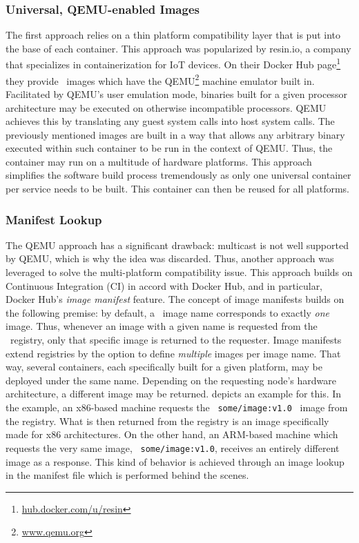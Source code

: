 \subsubsection{Universal, QEMU-enabled Images}
The first approach relies on a thin platform compatibility layer that is put into the base of each container. This approach was popularized by resin.io, a company that specializes in containerization for IoT devices. On their Docker Hub page\footnote{\url{hub.docker.com/u/resin}} they provide \docker\ images which have the QEMU\footnote{\url{www.qemu.org}} machine emulator built in. Facilitated by QEMU's user emulation mode, binaries built for a given processor architecture may be executed on otherwise incompatible processors. QEMU achieves this by translating any guest system calls into host system calls. The previously mentioned images are built in a way that allows any arbitrary binary executed within such container to be run in the context of QEMU. Thus, the container may run on a multitude of hardware platforms.
This approach simplifies the software build process tremendously as only one universal container per service needs to be built. This container can then be reused for all platforms.

\pagebreak
\subsubsection{Manifest Lookup}

The QEMU approach has a significant drawback: multicast is not well supported by QEMU, which is why the idea was discarded.
Thus, another approach was leveraged to solve the multi-platform compatibility issue. This approach builds on Continuous Integration (CI) in accord with Docker Hub, and in particular, Docker Hub's \emph{image manifest} feature. The concept of image manifests builds on the following premise: by default, a \docker\ image name corresponds to exactly \emph{one} image. Thus, whenever an image with a given name is requested from the \docker\ registry, only that specific image is returned to the requester. Image manifests extend registries by the option to define \emph{multiple} images per image name. That way, several containers, each specifically built for a given platform, may be deployed under the same name. Depending on the requesting node's hardware architecture, a different image may be returned.  depicts an example for this. In the example, an x86-based machine requests the \ \mbox{\texttt{some/image:v1.0}} \ image from the registry. What is then returned from the registry is an image specifically made for x86 architectures. On the other hand, an ARM-based machine which requests the very same image, \ \mbox{\texttt{some/image:v1.0}}, receives an entirely different image as a response. This kind of behavior is achieved through an image lookup in the manifest file which is performed behind the scenes.

